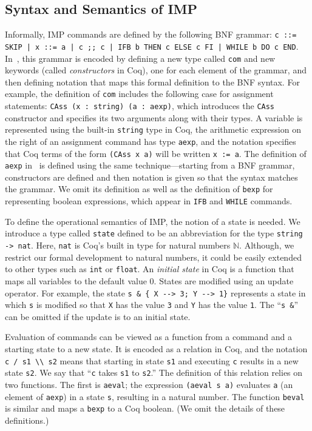 \documentclass[compsoc,conference,a4paper,10pt,times]{IEEEtran}
\begin{document}
\subsection{Syntax and Semantics of IMP}
\label{sec:syntaxsemantics}
Informally, IMP commands are defined by the following BNF grammar:
\texttt{c ::= SKIP | x ::= a | c ;; c | IFB b THEN c ELSE c FI | WHILE b DO c END}.
In~\cite{SFV2}, this grammar is encoded by defining a new type called \texttt{com} and new keywords (called \emph{constructors} in Coq), one for each element of the grammar, and then defining notation that maps this formal definition to the BNF syntax.  For example, the definition of \texttt{com} includes the following case for assignment statements: \texttt{CAss (x : string) (a : aexp)}, which introduces the \texttt{CAss} constructor and specifies its two arguments along with their types.  A variable is represented using the built-in \texttt{string} type in Coq, the arithmetic expression on the right of an assignment command has type \texttt{aexp}, and the notation specifies that Coq terms of the form \texttt{(CAss x a)} will be written \texttt{x := a}.
The definition of \texttt{aexp} in~\cite{SFV2} is defined using the same technique---starting from a BNF grammar, constructors are defined and then notation is given so that the syntax matches the grammar.  We omit its definition as well as the definition of \texttt{bexp} for representing boolean expressions, which appear in \texttt{IFB} and \texttt{WHILE} commands.

To define the operational semantics of IMP, the notion of a state is needed. We introduce a type called \texttt{state} defined to be an abbreviation for the type \texttt{string -> nat}.  Here, \texttt{nat} is Coq's built in type for natural numbers $\mathbb{N}$.  Although, we restrict our formal development to natural numbers, it could be easily extended to other types such as \texttt{int} or \texttt{float}.  An \textit{initial state} in Coq is a function that maps all variables to the default value $0$.  States are modified using an update operator.  For example, the state \verb|s & { X --> 3; Y --> 1}| represents a state in which \texttt{s} is modified so that \texttt{X} has the value \texttt{3} and \texttt{Y} has the value \texttt{1}.  The ``\verb|s &|'' can be omitted if the update is to an initial state.

Evaluation of commands can be viewed as a function from a command and a starting state to a new state.  It is encoded as a relation in Coq, and the notation \verb|c / s1 \\ s2| means that starting in state \texttt{s1} and executing \texttt{c} results in a new state \texttt{s2}.  We say that ``\texttt{c} takes \texttt{s1} to \texttt{s2}.''  The definition of this relation relies on two functions.  The first is \texttt{aeval};
the expression \texttt{(aeval s a)} evaluates \texttt{a} (an element of \texttt{aexp}) in a state \texttt{s}, resulting in a natural number. The function \texttt{beval} is similar and maps a \texttt{bexp} to a Coq boolean.  (We omit the details of these definitions.)
\end{document}

